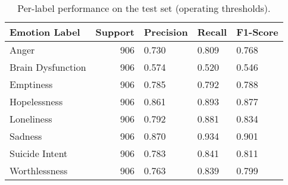 \begin{table}
\caption{Per-label performance on the test set (operating thresholds).}
\label{tab:per_label_performance}
\begin{tabular}{lrlll}
\toprule
Emotion Label & Support & Precision & Recall & F1-Score \\
\midrule
Anger & 906 & 0.730 & 0.809 & 0.768 \\
Brain Dysfunction & 906 & 0.574 & 0.520 & 0.546 \\
Emptiness & 906 & 0.785 & 0.792 & 0.788 \\
Hopelessness & 906 & 0.861 & 0.893 & 0.877 \\
Loneliness & 906 & 0.792 & 0.881 & 0.834 \\
Sadness & 906 & 0.870 & 0.934 & 0.901 \\
Suicide Intent & 906 & 0.783 & 0.841 & 0.811 \\
Worthlessness & 906 & 0.763 & 0.839 & 0.799 \\
\bottomrule
\end{tabular}
\end{table}
